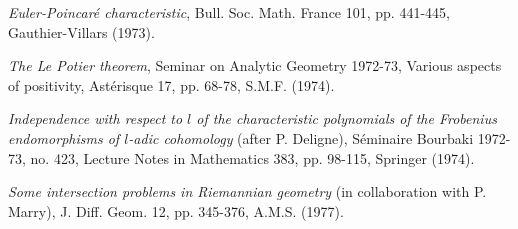 \begin{description}
\item[{[20]}] \emph{Euler-Poincaré characteristic}, Bull. Soc. Math.
France 101, pp. 441-445, Gauthier-Villars (1973).

\item[{[21]}] \emph{The Le Potier theorem}, Seminar on Analytic Geometry
1972-73, Various aspects of positivity, Astérisque 17, pp. 68-78,
S.M.F. (1974).

\item[{[22]}] \emph{Independence with respect to $l$ of the characteristic
polynomials of the Frobenius endomorphisms of $l$-adic cohomology}
(after P. Deligne), Séminaire Bourbaki 1972-73, no. 423,
Lecture Notes in Mathematics 383, pp. 98-115, Springer (1974).

\item[{[23]}] \emph{Some intersection problems in Riemannian geometry}
(in collaboration with P. Marry), J. Diff. Geom. 12, pp. 345-376,
A.M.S. (1977).
\end{description}

